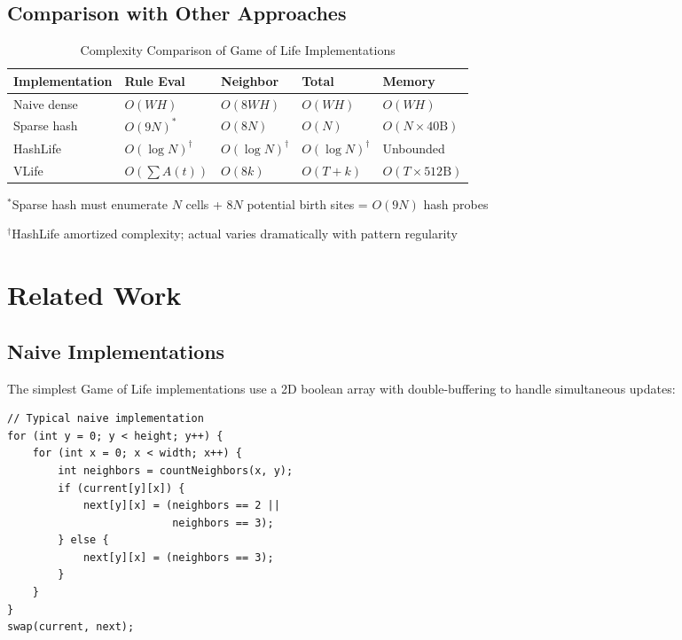 \documentclass[11pt]{article}
\theoremstyle{definition}
\begin{document}
    \subsection{Comparison with Other Approaches}

    \begin{table}[h]
        \centering
        \caption{Complexity Comparison of Game of Life Implementations}
        \begin{tabular}{@{}lllll@{}}
            \toprule
            \textbf{Implementation} & \textbf{Rule Eval} & \textbf{Neighbor} & \textbf{Total} & \textbf{Memory} \\
            \midrule
            Naive dense & $O(WH)$ & $O(8WH)$ & $O(WH)$ & $O(WH)$ \\
            Sparse hash & $O(9N)^*$ & $O(8N)$ & $O(N)$ & $O(N \times 40\text{B})$ \\
            HashLife & $O(\log N)^\dagger$ & $O(\log N)^\dagger$ & $O(\log N)^\dagger$ & Unbounded \\
            VLife & $O(\sum A(t))$ & $O(8k)$ & $O(T + k)$ & $O(T \times 512\text{B})$ \\
            \bottomrule
        \end{tabular}

        \footnotesize{$^*$Sparse hash must enumerate $N$ cells + $8N$ potential birth sites = $O(9N)$ hash probes}

        \footnotesize{$^\dagger$HashLife amortized complexity; actual varies dramatically with pattern regularity}
    \end{table}

    \section{Related Work}

    \subsection{Naive Implementations}

    The simplest Game of Life implementations use a 2D boolean array with double-buffering to handle simultaneous updates:

    \begin{lstlisting}
// Typical naive implementation
for (int y = 0; y < height; y++) {
    for (int x = 0; x < width; x++) {
        int neighbors = countNeighbors(x, y);
        if (current[y][x]) {
            next[y][x] = (neighbors == 2 ||
                          neighbors == 3);
        } else {
            next[y][x] = (neighbors == 3);
        }
    }
}
swap(current, next);
    \end{lstlisting}
\end{document}
